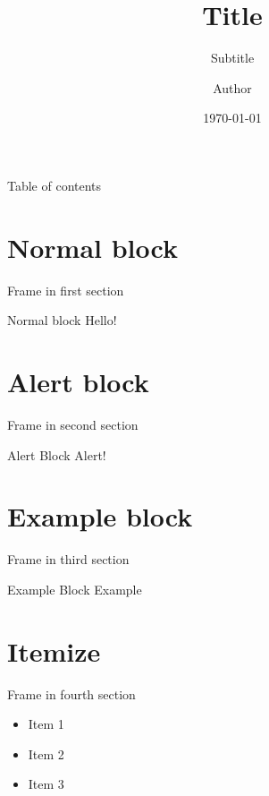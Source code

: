\documentclass[xetex,aspectratio=169]{beamer}
\title
    {Title}
\subtitle
    {Subtitle}
\author
    {Author}
\date{\today}
\begin{document}
    
    
    \begin{frame}
        \titlepage
    \end{frame}
    
    \begin{frame}{Table of contents}
        \begin{multicols}{2}
        	\tableofcontents[hideothersubsections]
        \end{multicols}
    \end{frame}
    
    \section{Normal block}
    \begin{frame}{Frame in first section}
        \begin{block}{Normal block}
            Hello!        
        \end{block}

    \end{frame}
    
    \section{Alert block}
    \begin{frame}{Frame in second section}
        \begin{alertblock}{Alert Block}
            Alert!
        \end{alertblock}
    \end{frame}

    \section{Example block}
    \begin{frame}{Frame in third section}
        \begin{exampleblock}{Example Block}
            Example
        \end{exampleblock}
    \end{frame}

    \section{Itemize}
    \begin{frame}{Frame in fourth section}
        \begin{itemize}
            \item Item 1
            \item Item 2
            \item Item 3
        \end{itemize}
    \end{frame}
\end{document}
